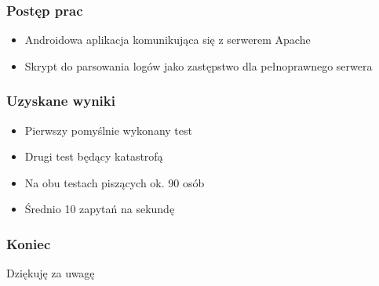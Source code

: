 \documentclass{beamer}
\begin{document}
  \begin{frame}
    \frametitle{Postęp prac}
    \begin{itemize}
    \item Androidowa aplikacja komunikująca się z serwerem Apache
    \item Skrypt do parsowania logów jako zastępstwo dla pełnoprawnego serwera
    \end{itemize}
  \end{frame}
  \begin{frame}
    \frametitle{Uzyskane wyniki}
    \begin{itemize}
    \item Pierwszy pomyślnie wykonany test
    \item Drugi test będący katastrofą
    \item Na obu testach piszących ok. 90 osób
    \item Średnio 10 zapytań na sekundę
    \end{itemize}
  \end{frame}
  \begin{frame}
  	\frametitle{Koniec}
    \begin{center}
    \Huge Dziękuję za uwagę
    \end{center}
  \end{frame}
\end{document}
